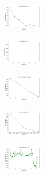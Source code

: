 \begin{figure}[H]
\begin{subfigure}
    \end{subfigure}
    \hfill
    \begin{subfigure}
        \centering
        \includegraphics[width=0.234\textwidth]{img/copkm/ecoli_set_const_10_589741062_cost.png}
    \end{subfigure}
    \hfill
    \begin{subfigure}
        \centering
        \includegraphics[width=0.234\textwidth]{img/copkm/rand_set_const_10_589741062_cost.png}
    \end{subfigure}
    \hfill
    \begin{subfigure}
        \centering
        \includegraphics[width=0.234\textwidth]{img/copkm/newthyroid_set_const_10_589741062_cost.png}
    \end{subfigure}
    \hfill
    \begin{subfigure}
        \centering
        \includegraphics[width=0.234\textwidth]{img/copkm/iris_set_const_10_277451237_cost.png}
    \end{subfigure}
    \hfill
    \begin{subfigure}
        \centering
        \includegraphics[width=0.234\textwidth]{img/copkm/ecoli_set_const_10_277451237_cost.png}
    \end{subfigure}
    \hfill

\end{figure}
